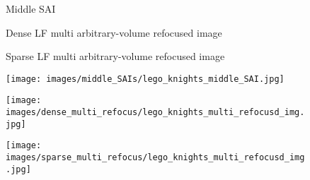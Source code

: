 
\begin{figure*}[]
    \centering
    
    \begin{subfigure}[c]{0.29\textwidth}
         \centering
         \caption*{Middle SAI}
     \end{subfigure}
     \hspace{0.1cm}
    \begin{subfigure}[c]{0.29\textwidth}
         \centering
         \caption*{Dense LF multi arbitrary-volume refocused image}
     \end{subfigure}
     \hspace{0.1cm}
     \begin{subfigure}[c]{0.29\textwidth}
         \centering
         \caption*{Sparse LF multi arbitrary-volume refocused image}
     \end{subfigure}

    \begin{subfigure}[t]{0.29\textwidth}
         \centering
         \texttt{[image: images/middle\_SAIs/lego\_knights\_middle\_SAI.jpg]}
     \end{subfigure}
     \hspace{0.1cm}
    \begin{subfigure}[t]{0.29\textwidth}
         \centering
         \texttt{[image: images/dense\_multi\_refocus/lego\_knights\_multi\_refocusd\_img.jpg]}
         \caption{}
     \end{subfigure}
     \hspace{0.1cm}
     \begin{subfigure}[t]{0.29\textwidth}
         \centering
         \texttt{[image: images/sparse\_multi\_refocus/lego\_knights\_multi\_refocusd\_img.jpg]}
     \end{subfigure}
     

     

\end{figure*}
